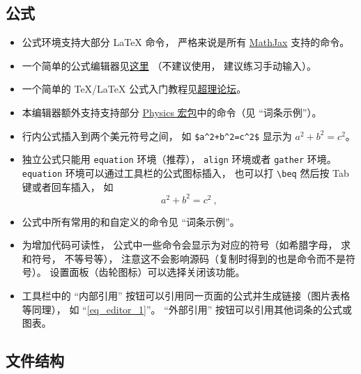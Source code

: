 \subsection{公式}
\begin{itemize}
\item 公式环境支持大部分 LaTeX 命令， 严格来说是所有 \href{https://www.mathjax.org/}{MathJax} 支持的命令。
\item 一个简单的公式编辑器见\href{https://www.codecogs.com/latex/eqneditor.php}{这里} （不建议使用， 建议练习手动输入）。
\item 一个简单的 TeX/LaTeX 公式入门教程见\href{https://chaoli.club/index.php/211}{超理论坛}。
\item 本编辑器额外支持支持部分 \href{http://mirrors.ibiblio.org/CTAN/macros/latex/contrib/physics/physics.pdf}{Physics 宏包}中的命令（见 “词条示例”）。
\item 行内公式插入到两个美元符号之间， 如 \verb|$a^2+b^2=c^2$| 显示为 $a^2 + b^2 = c^2$。
\item 独立公式只能用 \verb|equation| 环境（推荐）， \verb|align| 环境或者 \verb|gather| 环境。 \verb|equation| 环境可以通过工具栏的公式图标插入， 也可以打 \verb|\beq| 然后按 Tab 键或者回车插入， 如
\begin{equation}\label{eq_editor_1}
a^2 + b^2 = c^2~,
\end{equation}
\item 公式中所有常用的和自定义的命令见 “词条示例”。
\item 为增加代码可读性， 公式中一些命令会显示为对应的符号（如希腊字母， 求和符号， 不等号等）， 注意这不会影响源码（复制时得到的也是命令而不是符号）。 设置面板（齿轮图标）可以选择关闭该功能。
\item 工具栏中的 “内部引用” 按钮可以引用同一页面的公式并生成链接（图片表格等同理）， 如 “\autoref{eq_editor_1}”。 “外部引用” 按钮可以引用其他词条的公式或图表。
\end{itemize}

\subsection{文件结构}

